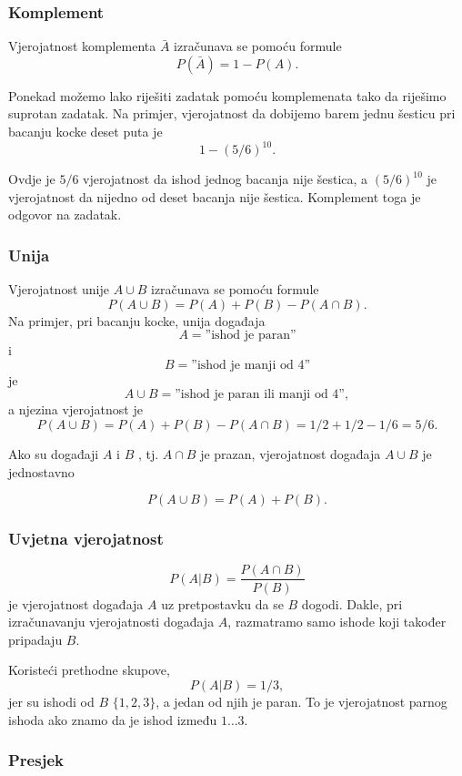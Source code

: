 \subsubsection{Komplement}

Vjerojatnost komplementa
$\bar A$ izračunava se pomoću formule
\[P(\bar A)=1-P(A).\]

Ponekad možemo lako riješiti zadatak
pomoću komplemenata tako da riješimo suprotan zadatak.
Na primjer, vjerojatnost da dobijemo
barem jednu šesticu pri bacanju kocke deset puta je
\[1-(5/6)^{10}.\]

Ovdje je $5/6$ vjerojatnost da ishod
jednog bacanja nije šestica, a
$(5/6)^{10}$ je vjerojatnost da nijedno od
deset bacanja nije šestica.
Komplement toga je odgovor na zadatak.

\subsubsection{Unija}

Vjerojatnost unije $A \cup B$
izračunava se pomoću formule
\[P(A \cup B)=P(A)+P(B)-P(A \cap B).\]
Na primjer, pri bacanju kocke,
unija događaja
\[A=\textrm{''ishod je paran''}\]
i
\[B=\textrm{''ishod je manji od 4''}\]
je
\[A \cup B=\textrm{''ishod je paran ili manji od 4''},\]
a njezina vjerojatnost je
\[P(A \cup B) = P(A)+P(B)-P(A \cap B)=1/2+1/2-1/6=5/6.\]

Ako su događaji $A$ i $B$ , tj.
$A \cap B$ je prazan,
vjerojatnost događaja $A \cup B$ je jednostavno

\[P(A \cup B)=P(A)+P(B).\]

\subsubsection{Uvjetna vjerojatnost}


\[P(A | B) = \frac{P(A \cap B)}{P(B)}\]
je vjerojatnost događaja $A$
uz pretpostavku da se $B$ dogodi.
Dakle, pri izračunavanju
vjerojatnosti događaja $A$, razmatramo samo ishode
koji također pripadaju $B$.

Koristeći prethodne skupove,
\[P(A | B)= 1/3,\]
jer su ishodi od $B$
$\{1,2,3\}$, a jedan od njih je paran.
To je vjerojatnost parnog ishoda
ako znamo da je ishod između $1 \ldots 3$.

\subsubsection{Presjek}

